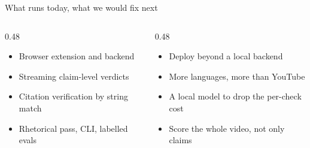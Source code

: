 \begin{frame}{What runs today, what we would fix next}
  \vspace{1.5mm}

  \begin{columns}[T]
    \begin{column}{0.48\textwidth}
      \vspace{1.5mm}
      \begin{itemize}
        \item Browser extension and backend
        \item Streaming claim-level verdicts
        \item Citation verification by string match
        \item Rhetorical pass, CLI, labelled evals
      \end{itemize}
    \end{column}
    \begin{column}{0.48\textwidth}
      \color{adminifaint}
      \vspace{1.5mm}
      \begin{itemize}
        \item Deploy beyond a local backend
        \item More languages, more than YouTube
        \item A local model to drop the per-check cost
        \item Score the whole video, not only claims
      \end{itemize}
    \end{column}
  \end{columns}

  \vspace{2mm}
\end{frame}
